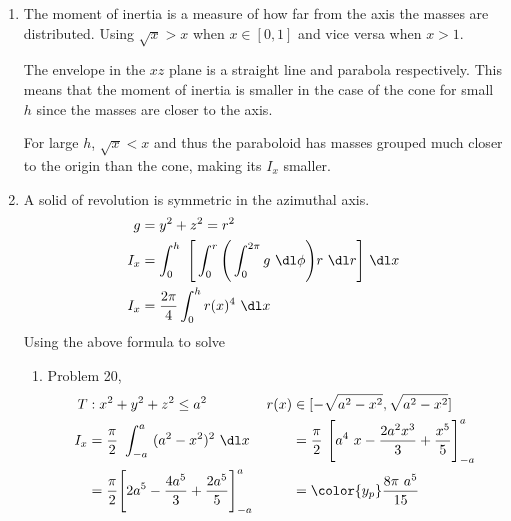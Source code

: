 \begin{enumerate}
    \item The moment of inertia is a measure of how far from the axis the masses
          are distributed. Using $ \sqrt{x} > x $ when $ x \in [0, 1] $ and
          vice versa when $ x > 1 $. \par

          The envelope in the $ xz $ plane is a straight line and parabola respectively.
          This means that the moment of inertia is smaller in the case of the cone
          for small $ h $ since the masses are closer to the axis. \par

          For large $ h $, $ \sqrt{x} < x $ and thus the paraboloid has masses grouped
          much closer to the origin than the cone, making its $ I_x $ smaller.

    \item A solid of revolution is symmetric in the azimuthal axis.
          \begin{align}
              g   & = y^2 + z^2 = r^2                                        \\
              I_x & = \int_{0}^{h}\ \Bigg[\int_{0}^{r} \Bigg(\int_{0}^{2\pi}
              g\ \dl \phi \Bigg) r\ \dl r\Bigg]\ \dl x                       \\
              I_x & = \frac{2\pi}{4} \int_{0}^{h} r(x)^4\ \dl x
          \end{align}
          Using the above formula to solve
          \begin{enumerate}
              \item Problem 20,
                    \begin{align}
                        T               & : x^2 + y^2 + z^2 \leq a^2         &
                        r(x)            & \in [-\sqrt{a^2 - x^2},
                        \sqrt{a^2 - x^2}]                                      \\
                        I_x             & = \frac{\pi}{2}\ \int_{-a}^{a}
                        \ (a^2 - x^2)^2
                        \ \dl x         &
                                        & = \frac{\pi}{2}\ \Bigg[ a^4\ x
                        - \frac{2a^2x^3}{3} + \frac{x^5}{5} \Bigg]_{-a}^{a}    \\
                                        & = \frac{\pi}{2} \Bigg[ 2a^5
                            - \frac{4a^5}{3} +
                            \frac{2a^5}{5}
                        \Bigg]_{-a}^{a} &
                                        & = \color{y_p} \frac{8\pi\ a^5}{15}

\end{align}
\end{enumerate}
\end{enumerate}
